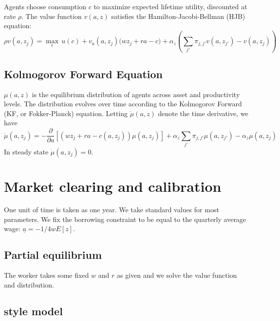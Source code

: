 \documentclass[11pt,english]{article}
\begin{document}
Agents choose consumption \( c \) to maximize expected lifetime utility, discounted at rate \( \rho \). The value function \( v(a, z ) \) satisfies the Hamilton-Jacobi-Bellman (HJB) equation:
\begin{equation}
\label{eq:hjb1}
\rho v(a, z_j) = \max_{c} \, u(c) + v_a(a, z_j )\big(w z_j + r a - c\big)  + \alpha_z \left( \sum_{j'} \pi_{j,j'} v(a, z_{j'}) - v(a, z_j) \right)
\end{equation}

\subsection{Kolmogorov Forward Equation} 

$\mu(a,z)$ is the equilibrium distribution of agents across asset and productivity levels. The distribution evolves over time according to the Kolmogorov Forward (KF, or Fokker-Planck) equation. Letting $\dot \mu(a, z)$ denote the time derivative, we have
\begin{equation}
\label{eq:kf1}
\dot \mu(a, z_j) = - \frac{\partial}{\partial a} \left[ \left( w z_j + r  a - c(a,z_j) \right) \mu(a, z_j) \right]  + \alpha_z \sum_{j'} \pi_{j,j'} \mu(a, z_{j'}) - \alpha_z \mu(a, z_j)
\end{equation}
In steady state $\dot \mu(a, z_j) = 0$. 


\section{Market clearing and calibration} 

One unit of time is taken as one year. We take standard values for most parameters. We fix the borrowing constraint to be equal to the quarterly average wage: $\underline a = -1/4 w E[z]$. 

\subsection{Partial equilibrium}

The worker takes some fixed $w$ and $r$ as given and we solve the value function and distribution. 

\subsection{\cite{AiyagariUninsured1994} style model}
\end{document}
